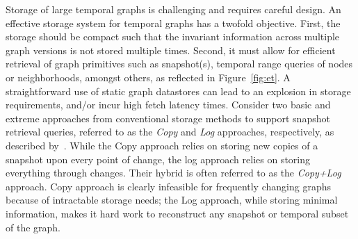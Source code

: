 \documentclass[graybox, natbib, nosecnum, twocolumn]{svmult}
\begin{document}
Storage of large temporal graphs is challenging and requires careful design. An effective storage system for temporal graphs has a twofold objective. First, the storage should be compact such that the invariant information across multiple graph versions is not stored multiple times. Second, it must allow for efficient retrieval of graph primitives such as snapshot(s), temporal range queries of nodes or neighborhoods, amongst others, as reflected in Figure~\ref{fig:et}. A straightforward use of static graph datastores can lead to an explosion in storage requirements, and/or incur high fetch latency times.  
Consider two basic and extreme approaches from conventional storage methods 
to support snapshot retrieval queries, referred to as the \textit{Copy} and \textit{Log} approaches, respectively, as described by~\cite{Salzberg1999}. While the Copy approach relies on storing new copies of a snapshot upon every point of change, the log approach relies on storing everything through changes. Their hybrid is often referred to as the \textit{Copy+Log} approach. Copy approach is clearly infeasible for frequently changing graphs because of intractable storage needs; the Log approach, while storing minimal information, makes it hard work to reconstruct any snapshot or temporal subset of the graph. %
\end{document}
